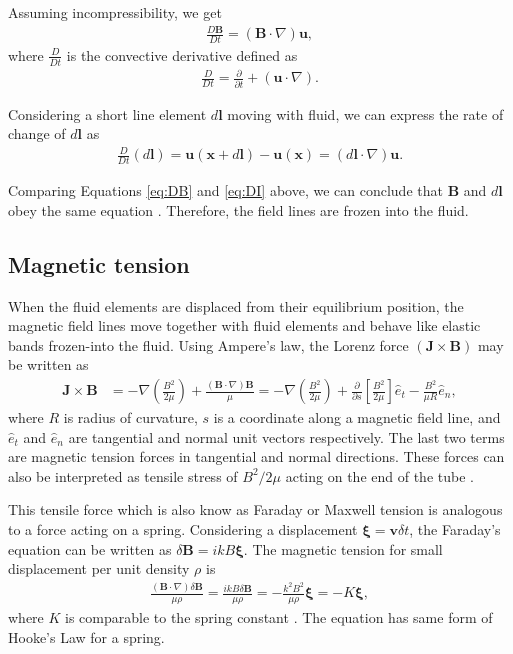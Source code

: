 \documentclass{jfm}
\newcommand{\del}{\nabla}
\begin{document}
Assuming incompressibility, we get
\begin{align}
    \frac{D \mathbf{B}}{D t} = (\mathbf{B}\cdot \del) \mathbf{u},
    \label{eq:DB}
\end{align}
where $\frac{D}{Dt}$ is the convective derivative defined as
\begin{align}
    \frac{D}{Dt} = \frac{\partial}{\partial t} + (\mathbf{u} \cdot \del) .
\end{align}

Considering a short line element $d\mathbf{l}$ moving with fluid, we can express 
the rate of change of $d\mathbf{l}$ as
\begin{align}
    \frac{D}{Dt}\left(d\mathbf{l}\right) = \mathbf{u}(\mathbf{x}+d\mathbf{l})-\mathbf{u}(\mathbf{x})=(d\mathbf{l}\cdot\del)\mathbf{u}.
    \label{eq:DI}
\end{align}

Comparing Equations \ref{eq:DB} and \ref{eq:DI} above, we can conclude that $\mathbf{B}$ and 
$d\mathbf{l}$ obey the same equation \citep{Davidson2001}. Therefore, the 
field lines are frozen into the fluid.


%
%
\subsection{Magnetic tension}

When the fluid elements are displaced from their equilibrium position, the 
magnetic field lines move together with fluid elements and behave like elastic
bands frozen-into the fluid. Using Ampere's law, the Lorenz force 
$(\mathbf{J}\times\mathbf{B})$ may be written as
\begin{align}
    \mathbf{J}\times\mathbf{B} &= - \del\left(\frac{B^2}{2\mu}\right) +\frac{(\mathbf{B}\cdot \del)\mathbf{B}}{\mu}
    =- \del\left(\frac{B^2}{2\mu}\right)+\frac{\partial}{\partial s} \left[\frac{B^2}{2\mu}\right]\hat{e}_t - \frac{B^2}{\mu R}\hat{e}_n ,
\end{align} 
where $R$ is radius of curvature, $s$ is a coordinate along a magnetic field
line, and $\hat{e}_t$ and $\hat{e}_n$ are tangential and normal unit vectors
respectively. The last two terms are magnetic tension forces in tangential and
normal directions. These forces can also be interpreted as tensile stress of
$B^2/2\mu$ acting on the end of the tube \citep{Davidson2001}. 

This tensile force which is also know as Faraday or Maxwell tension is
analogous to a force acting on a spring. Considering a displacement
$\boldsymbol{\xi}=\mathbf{v}\delta t$, the Faraday's equation can be written as
$\delta \mathbf{B} = ikB\boldsymbol{\xi}$. The magnetic tension for small
displacement per unit density $\rho$ is
\begin{align}
    \frac{(\mathbf{B}\cdot\del)\delta \mathbf{B}}{\mu \rho}=\frac{ikB\delta \mathbf{B}}{\mu \rho} = -\frac{k^2 B^2}{\mu\rho} \boldsymbol{\xi} = -K \boldsymbol{\xi},
\end{align}
where $K$ is comparable to the spring constant \citep{Balbus1998}.
The equation has same form of Hooke's Law for a spring.
\end{document}
